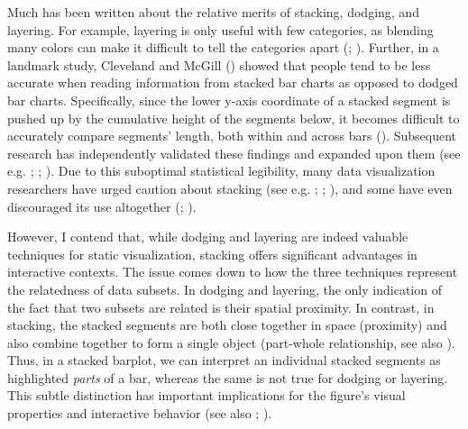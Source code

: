 \documentclass[
]{book}
\theoremstyle{definition}
\theoremstyle{definition}
\theoremstyle{definition}
\theoremstyle{definition}
\theoremstyle{remark}
\begin{document}
Much has been written about the relative merits of stacking, dodging, and layering. For example, layering is only useful with few categories, as blending many colors can make it difficult to tell the categories apart (; ). Further, in a landmark study, Cleveland and McGill () showed that people tend to be less accurate when reading information from stacked bar charts as opposed to dodged bar charts. Specifically, since the lower y-axis coordinate of a stacked segment is pushed up by the cumulative height of the segments below, it becomes difficult to accurately compare segments' length, both within and across bars (). Subsequent research has independently validated these findings and expanded upon them (see e.g. ; ; ). Due to this suboptimal statistical legibility, many data visualization researchers have urged caution about stacking (see e.g. ; ; ), and some have even discouraged its use altogether (; ).

However, I contend that, while dodging and layering are indeed valuable techniques for static visualization, stacking offers significant advantages in interactive contexts. The issue comes down to how the three techniques represent the relatedness of data subsets. In dodging and layering, the only indication of the fact that two subsets are related is their spatial proximity. In contrast, in stacking, the stacked segments are both close together in space (proximity) and also combine together to form a single object (part-whole relationship, see also ). Thus, in a stacked barplot, we can interpret an individual stacked segments as highlighted \emph{parts} of a bar, whereas the same is not true for dodging or layering. This subtle distinction has important implications for the figure's visual properties and interactive behavior (see also ; ).
\end{document}
